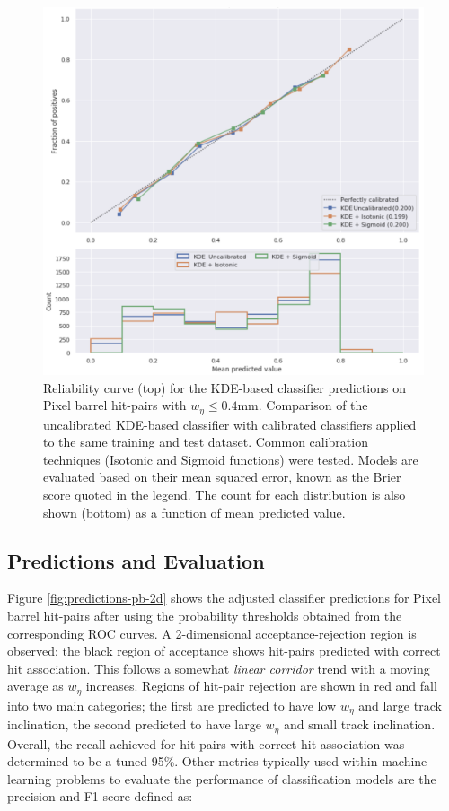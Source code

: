 \begin{figure}[!htbp]
\centering
\includegraphics[width=1.0\linewidth]{images/4-ml-based-predictor/calibration2.png}
\caption{Reliability curve (top) for the KDE-based classifier predictions on Pixel barrel hit-pairs with $ w_{\eta} \leq 0.4$mm. Comparison of the uncalibrated KDE-based classifier with calibrated classifiers applied to the same training and test dataset. Common calibration techniques (Isotonic and Sigmoid functions) were tested. Models are evaluated based on their mean squared error, known as the Brier score quoted in the legend. The count for each distribution is also shown (bottom) as a function of mean predicted value.}
\label{fig:calibration}
\end{figure}


\subsection{Predictions and Evaluation}

Figure \ref{fig:predictions-pb-2d} shows the adjusted classifier predictions for Pixel barrel hit-pairs after using the probability thresholds obtained from the corresponding ROC curves. A 2-dimensional acceptance-rejection region is observed; the black region of acceptance shows hit-pairs predicted with correct hit association. This follows a somewhat \textit{linear corridor} trend with a moving average as $w_{\eta}$ increases. Regions of hit-pair rejection are shown in red and fall into two main categories; the first are predicted to have low $w_{\eta}$ and large track inclination, the second predicted to have large $w_{\eta}$ and small track inclination. Overall, the recall achieved for hit-pairs with correct hit association was determined to be a tuned 95\%. Other metrics typically used within machine learning problems to evaluate the performance of classification models are the precision and F1 score defined as:


